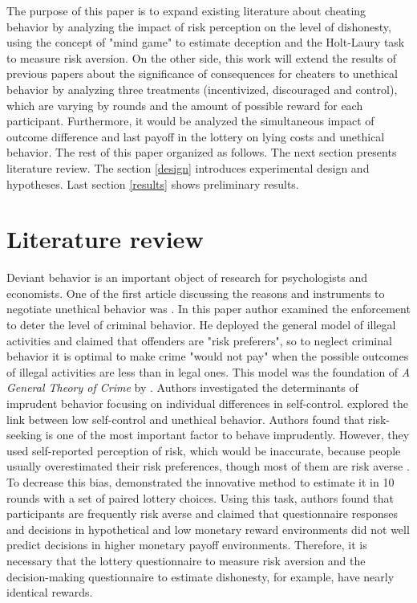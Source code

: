 \documentclass[12pt]{article}
\begin{document}
	The purpose of this paper is to expand existing literature about cheating behavior by analyzing the impact of risk perception on the level of dishonesty, using the concept of "mind game" to estimate deception and the Holt-Laury task to measure risk aversion. On the other side, this work will extend the results of previous papers about the significance of consequences for cheaters to unethical behavior by analyzing three treatments (incentivized, discouraged and control), which are varying by rounds and the amount of possible reward for each participant. Furthermore, it would be analyzed the simultaneous impact of outcome difference and last payoff in the lottery on lying costs and unethical behavior. The rest of this paper organized as follows. The next section presents literature review. The section \ref{design} introduces experimental design and hypotheses. Last section \ref{results} shows preliminary results.
	
	
	\section{Literature review}\label{lit}
	
	 Deviant behavior is an important object of research for psychologists and economists. One of the first article discussing the reasons and instruments to negotiate unethical behavior was \cite{becker1968crime}. In this paper author examined the enforcement to deter the level of criminal behavior. He deployed the general model of illegal activities and claimed that offenders are "risk preferers", so to neglect criminal behavior it is optimal to make crime "would not pay" when the possible outcomes of illegal activities are less than in legal ones. This model was the foundation of \textit{A General Theory of Crime} by \cite{gottfredson1990general}. Authors investigated the determinants of imprudent behavior focusing on individual differences in self-control. \cite{arneklev1993low} explored the link between low self-control and unethical behavior. Authors found that risk-seeking is one of the most important factor to behave imprudently. However, they used self-reported perception of risk, which would be inaccurate, because people usually overestimated their risk preferences, though most of them are risk averse \cite{kai1979prospect}. To decrease this bias, \cite{holt2002risk} demonstrated the innovative method to estimate it in 10 rounds with a set of paired lottery choices. Using this task, authors found that participants are frequently risk averse and claimed that questionnaire responses and decisions in hypothetical and low monetary reward environments did not well predict decisions in higher monetary payoff environments. Therefore, it is necessary that the lottery questionnaire to measure risk aversion and the decision-making questionnaire to estimate dishonesty, for example, have nearly identical rewards.
	 
\end{document}
